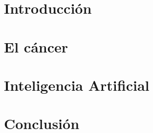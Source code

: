 \section{Introducción}


\section{El cáncer}


\section{Inteligencia Artificial}


\section{Conclusión}

